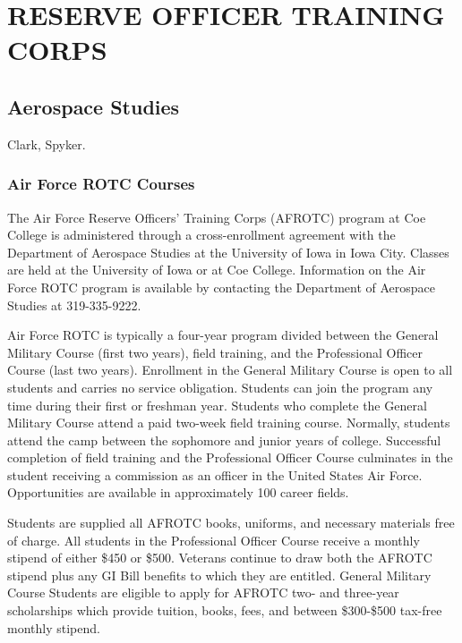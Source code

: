 \documentclass[
  letterpaper,
]{scrbook}
\begin{document}
\chapter{RESERVE OFFICER TRAINING
CORPS}\label{reserve-officer-training-corps}

\section{Aerospace Studies}\label{aerospace-studies}

Clark, Spyker.

\subsection{Air Force ROTC Courses}\label{air-force-rotc-courses}

The Air Force Reserve Officers' Training Corps (AFROTC) program at Coe
College is administered through a cross-enrollment agreement with the
Department of Aerospace Studies at the University of Iowa in Iowa City.
Classes are held at the University of Iowa or at Coe College.
Information on the Air Force ROTC program is available by contacting the
Department of Aerospace Studies at 319-335-9222.

Air Force ROTC is typically a four-year program divided between the
General Military Course (first two years), field training, and the
Professional Officer Course (last two years). Enrollment in the General
Military Course is open to all students and carries no service
obligation. Students can join the program any time during their first or
freshman year. Students who complete the General Military Course attend
a paid two-week field training course. Normally, students attend the
camp between the sophomore and junior years of college. Successful
completion of field training and the Professional Officer Course
culminates in the student receiving a commission as an officer in the
United States Air Force. Opportunities are available in approximately
100 career fields.

Students are supplied all AFROTC books, uniforms, and necessary
materials free of charge. All students in the Professional Officer
Course receive a monthly stipend of either \$450 or \$500. Veterans
continue to draw both the AFROTC stipend plus any GI Bill benefits to
which they are entitled. General Military Course Students are eligible
to apply for AFROTC two- and three-year scholarships which provide
tuition, books, fees, and between \$300-\$500 tax-free monthly stipend.
\end{document}
